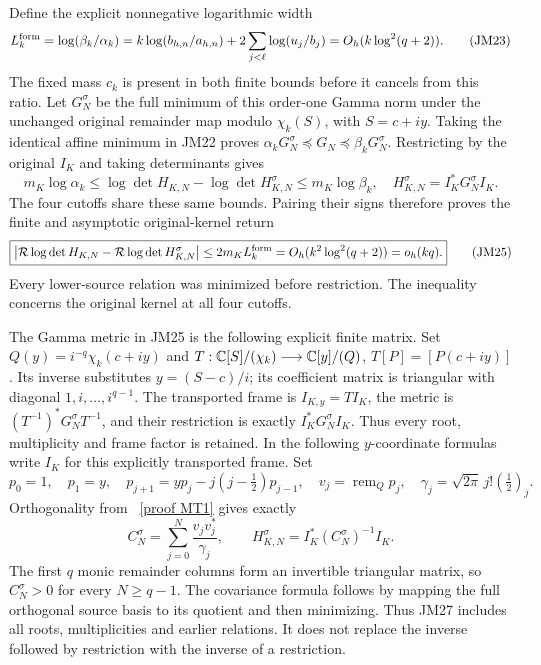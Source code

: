 \documentclass[11pt]{article}
\begin{document}
Define the explicit nonnegative logarithmic width
\[
 L_k^{\rm form}=\log(\beta_k/\alpha_k)
 =k\log(b_{h,n}/a_{h,n})
   +2\sum_{j<\ell}\log(u_j/b_j)
 =O_h(k\log^2(q+2)).\tag{JM23}
\]
The fixed mass $c_k$ is present in both finite bounds before it
cancels from this ratio. Let $G_N^\sigma$ be the full minimum of
this order-one Gamma norm under the unchanged original remainder
map modulo $\chi_k(S)$, with $S=c+iy$.
Taking the identical affine minimum in JM22 proves
$\alpha_kG_N^\sigma\preceq G_N\preceq\beta_kG_N^\sigma$.
Restricting by the original $I_K$ and taking determinants gives
\[
 m_K\log\alpha_k\le
 \log\det H_{K,N}-\log\det H_{K,N}^\sigma
 \le m_K\log\beta_k,
 \quad H_{K,N}^\sigma=I_K^*G_N^\sigma I_K.\tag{JM24}
\]
The four cutoffs share these same bounds. Pairing their signs
therefore proves the finite and asymptotic original-kernel return
\[
 \boxed{\left|\mathcal R\log\det H_{K,N}
 -\mathcal R\log\det H_{K,N}^\sigma\right|
 \le2m_KL_k^{\rm form}=O_h(k^2\log^2(q+2))=o_h(kq).}
 \tag{JM25}
\]
Every lower-source relation was minimized before restriction.
The inequality concerns the original kernel at all four cutoffs.

The Gamma metric in JM25 is the following explicit finite matrix.
Set $Q(y)=i^{-q}\chi_k(c+iy)$ and
$T:\mathbb C[S]/(\chi_k)\longrightarrow\mathbb C[y]/(Q)$,
$T[P]=[P(c+iy)]$. Its inverse substitutes $y=(S-c)/i$;
its coefficient matrix is triangular with diagonal $1,i,\ldots,i^{q-1}$.
The transported frame is $I_{K,y}=TI_K$, the metric is
$(T^{-1})^*G_N^\sigma T^{-1}$, and their restriction is exactly
$I_K^*G_N^\sigma I_K$. Thus every root, multiplicity and frame
factor is retained. In the following $y$-coordinate formulas write
$I_K$ for this explicitly transported frame. Set
\[
 p_0=1,\quad p_1=y,\quad
 p_{j+1}=yp_j-j(j-\tfrac12)p_{j-1},\quad
 v_j=\operatorname{rem}_{Q}p_j,\quad
 \gamma_j=\sqrt{2\pi}\,j!(\tfrac12)_j.
 \tag{JM26}
\]
Orthogonality from \cite{mrjm:MP}%
~\href{https://github.com/KokunoYumeto/zeta-function-research-reader/blob/main/workbenches/splitzero-tandem/continuations/20260921-kernel-degree-steps/providers/OBSERVATION_COMPLETE_PROOFS.tex\#L1629}{[proof MT1]}%
{} gives exactly
\[
 C_N^\sigma=\sum_{j=0}^N\frac{v_jv_j^*}{\gamma_j},\qquad
 H_{K,N}^\sigma=I_K^*(C_N^\sigma)^{-1}I_K.\tag{JM27}
\]
The first $q$ monic remainder columns form an invertible triangular
matrix, so $C_N^\sigma>0$ for every $N\ge q-1$. The covariance
formula follows by mapping the full orthogonal source basis to its
quotient and then minimizing. Thus JM27 includes all roots,
multiplicities and earlier relations. It does not replace the
inverse followed by restriction with the inverse of a restriction.
\end{document}
